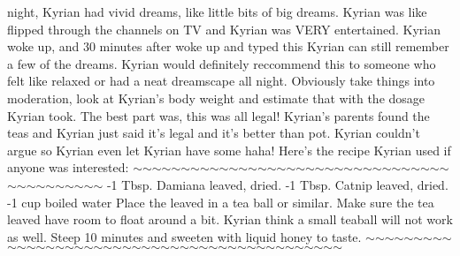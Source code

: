 \documentclass[12pt]{book}
\begin{document}
night, Kyrian had vivid dreams, like little bits of big dreams. Kyrian was like flipped through the channels on TV and Kyrian was VERY entertained. Kyrian woke up, and 30 minutes after woke up and typed this Kyrian can still remember a few of the dreams. Kyrian would definitely reccommend this to someone who felt like relaxed or had a neat dreamscape all night. Obviously take things into moderation, look at Kyrian's body weight and estimate that with the dosage Kyrian took. The best part was, this was all legal! Kyrian's parents found the teas and Kyrian just said it's legal and it's better than pot. Kyrian couldn't argue so Kyrian even let Kyrian have some haha! Here's the recipe Kyrian used if anyone was interested: $\sim$$\sim$$\sim$$\sim$$\sim$$\sim$$\sim$$\sim$$\sim$$\sim$$\sim$$\sim$$\sim$$\sim$$\sim$$\sim$$\sim$$\sim$$\sim$$\sim$$\sim$$\sim$$\sim$$\sim$$\sim$$\sim$$\sim$$\sim$$\sim$$\sim$$\sim$$\sim$$\sim$$\sim$$\sim$$\sim$$\sim$$\sim$$\sim$$\sim$$\sim$$\sim$$\sim$ -1 Tbsp. Damiana leaved, dried. -1 Tbsp. Catnip leaved, dried. -1 cup boiled water Place the leaved in a tea ball or similar. Make sure the tea leaved have room to float around a bit. Kyrian think a small teaball will not work as well. Steep 10 minutes and sweeten with liquid honey to taste. $\sim$$\sim$$\sim$$\sim$$\sim$$\sim$$\sim$$\sim$$\sim$$\sim$$\sim$$\sim$$\sim$$\sim$$\sim$$\sim$$\sim$$\sim$$\sim$$\sim$$\sim$$\sim$$\sim$$\sim$$\sim$$\sim$$\sim$$\sim$$\sim$$\sim$$\sim$$\sim$$\sim$$\sim$$\sim$$\sim$$\sim$$\sim$$\sim$$\sim$$\sim$$\sim$$\sim$$\sim$
\end{document}
